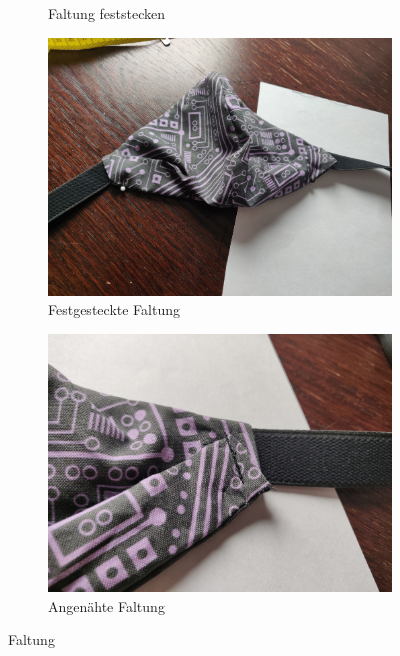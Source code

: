 \documentclass[12pt,parskip=full]{scrartcl}
\begin{document}
\begin{figure}[hp]
\begin{subfigure}{0.48\textwidth}
        \caption{Faltung feststecken}
        \label{Folding4}
    \end{subfigure}
    \begin{subfigure}{0.48\textwidth}
        \centering
        \includegraphics[width = \linewidth]{Pictures/11_Folding/Folding5_resized.jpg}
        \caption{Festgesteckte Faltung}
        \label{Folding5}
    \end{subfigure}
    \begin{subfigure}{0.48\textwidth}
        \centering
        \includegraphics[width = \linewidth]{Pictures/11_Folding/Folding6_resized.jpg}
        \caption{Angenähte Faltung}
        \label{Folding6}
    \end{subfigure}
    \caption{Faltung}
    \label{Folding}
\end{figure}
\end{document}
